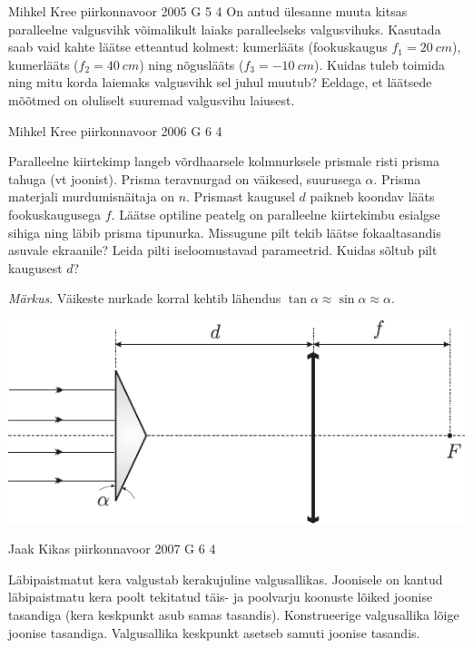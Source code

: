 \documentclass[11pt, twoside]{article}
\begin{document}
{%
{Mihkel Kree} %
{piirkonnavoor} %
{2005} %
{G 5} %
{4} %
{
\ifStatement
On antud ülesanne muuta kitsas paralleelne valgusvihk võimalikult laiaks paralleelseks valgusvihuks. Kasutada saab vaid kahte läätse etteantud kolmest: kumerlääts (fookuskaugus $f_1 = \SI{20}{cm}$), kumerlääts ($f_2 = \SI{40}{cm}$) ning nõguslääts ($f_3 = \SI{-10}{cm}$). Kuidas tuleb toimida ning mitu korda laiemaks valgusvihk sel juhul muutub? Eeldage, et läätsede mõõtmed on oluliselt suuremad valgusvihu laiusest.
\fi
}

{Mihkel Kree} %
{piirkonnavoor} %
{2006} %
{G 6} %
{4} %
{
\ifStatement
Paralleelne kiirtekimp langeb võrdhaarsele kolmnurksele prismale risti prisma tahuga (vt joonist). Prisma teravnurgad on väikesed, suurusega $\alpha$. Prisma materjali murdumisnäitaja on $n$. Prismast kaugusel $d$ paikneb koondav lääts fookuskaugusega $f$. Läätse optiline peatelg on paralleelne kiirtekimbu esialgse sihiga ning läbib prisma tipunurka. Missugune pilt tekib läätse fokaaltasandis asuvale ekraanile? Leida pilti iseloomustavad parameetrid. Kuidas sõltub pilt kaugusest $d$? 

\emph{Märkus}. Väikeste nurkade korral kehtib lähendus $\tan \alpha \approx \sin \alpha \approx \alpha$.

\begin{center}
	\includegraphics[width=\linewidth]{2006-v2g-06-yl}
\end{center}
\fi
}

{Jaak Kikas} %
{piirkonnavoor} %
{2007} %
{G 6} %
{4} %
{
\ifStatement
Läbipaistmatut kera valgustab kerakujuline valgusallikas. Joonisele on kantud läbipaistmatu kera poolt tekitatud täis- ja poolvarju koonuste lõiked joonise tasandiga (kera keskpunkt asub samas tasandis). Konstrueerige valgusallika lõige joonise tasandiga. Valgusallika keskpunkt asetseb samuti joonise tasandis.

}}
\end{document}
